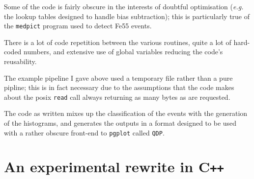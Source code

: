 \documentclass[12pt]{article}
\newcommand{\CPP}{C\texttt{++}\xspace}  %
\begin{document}
Some of the code is fairly obscure in the interests of doubtful optimisation (\textit{e.g.} the lookup tables
designed to handle bias subtraction); this is particularly true of the \texttt{medpict} program used to
detect Fe55 events.

There is a lot of code repetition between the various routines, quite a lot of hard-coded numbers, and
extensive use of global variables reducing the code's reusability.

The example pipeline I gave above used a temporary file rather than a pure pipline; this is in fact necessary
due to the assumptions that the code makes about the posix \texttt{read} call always returning as many bytes
as are requested.

The code as written mixes up the classification of the events with the generation of the histograms, and
generates the outputs in a format designed to be used with a rather obscure front-end to \texttt{pgplot}
called \texttt{QDP}.

\section{An experimental rewrite in \CPP}
\end{document}
